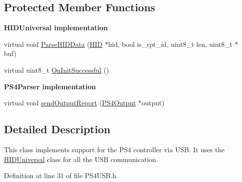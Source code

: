 \subsection*{\-Protected \-Member \-Functions}
\begin{Indent}{\bf \-H\-I\-D\-Universal implementation}\par
\begin{DoxyCompactItemize}
\item 
virtual void \hyperlink{class_p_s4_u_s_b_acf805149a0417d40895d5315b6ead9e6}{\-Parse\-H\-I\-D\-Data} (\hyperlink{class_h_i_d}{\-H\-I\-D} $\ast$hid, bool is\-\_\-rpt\-\_\-id, uint8\-\_\-t len, uint8\-\_\-t $\ast$buf)
\item 
virtual uint8\-\_\-t \hyperlink{class_p_s4_u_s_b_a591218572aa8c5f5402483d19c1eebc6}{\-On\-Init\-Successful} ()
\end{DoxyCompactItemize}
\end{Indent}
\begin{Indent}{\bf \-P\-S4\-Parser implementation}\par
\begin{DoxyCompactItemize}
\item 
virtual void \hyperlink{class_p_s4_u_s_b_a75dc09d15f149e1a1b96b8d2ccbbff89}{send\-Output\-Report} (\hyperlink{struct_p_s4_output}{\-P\-S4\-Output} $\ast$output)
\end{DoxyCompactItemize}
\end{Indent}


\subsection{\-Detailed \-Description}
\-This class implements support for the \-P\-S4 controller via \-U\-S\-B. \-It uses the \hyperlink{class_h_i_d_universal}{\-H\-I\-D\-Universal} class for all the \-U\-S\-B communication. 

\-Definition at line 31 of file \-P\-S4\-U\-S\-B.\-h.



